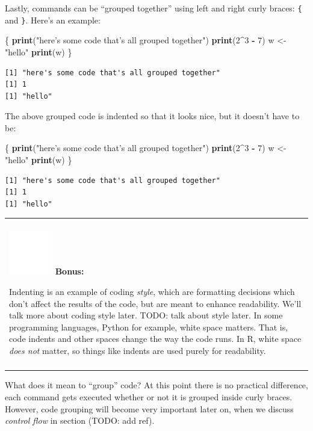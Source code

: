 \documentclass[
]{book}
\newenvironment{Shaded}{\begin{snugshade}}{\end{snugshade}}
\newcommand{\DecValTok}[1]{\textcolor[rgb]{0.00,0.00,0.81}{#1}}
\newcommand{\KeywordTok}[1]{\textcolor[rgb]{0.13,0.29,0.53}{\textbf{#1}}}
\newcommand{\NormalTok}[1]{#1}
\newcommand{\OperatorTok}[1]{\textcolor[rgb]{0.81,0.36,0.00}{\textbf{#1}}}
\newcommand{\StringTok}[1]{\textcolor[rgb]{0.31,0.60,0.02}{#1}}
\newenvironment{bonus}
{
  \begin{center}
  \begin{tabular}{|>{\columncolor{bonus}\color{white}}p{0.9\textwidth}|}\hline\\
  \includegraphics[scale=0.1]{src/images/sun-fill-invert.png}
  \textbf{Bonus:}
}
{\\\\\hline
  \end{tabular}
  \end{center}
}
\begin{document}
Lastly, commands can be ``grouped together'' using left and right curly braces: \texttt{\{} and \texttt{\}}.
Here's an example:

\begin{Shaded}
\begin{Highlighting}[]
\NormalTok{\{}
  \KeywordTok{print}\NormalTok{(}\StringTok{"here's some code that's all grouped together"}\NormalTok{)}
  \KeywordTok{print}\NormalTok{(}\DecValTok{2}\OperatorTok{^}\DecValTok{3} \OperatorTok{-}\StringTok{ }\DecValTok{7}\NormalTok{)}
\NormalTok{  w <-}\StringTok{ "hello"}
  \KeywordTok{print}\NormalTok{(w)}
\NormalTok{\}}
\end{Highlighting}
\end{Shaded}

\begin{verbatim}
[1] "here's some code that's all grouped together"
[1] 1
[1] "hello"
\end{verbatim}

The above grouped code is indented so that it looks nice, but it doesn't have to be:

\begin{Shaded}
\begin{Highlighting}[]
\NormalTok{\{}
\KeywordTok{print}\NormalTok{(}\StringTok{"here's some code that's all grouped together"}\NormalTok{)}
\KeywordTok{print}\NormalTok{(}\DecValTok{2}\OperatorTok{^}\DecValTok{3} \OperatorTok{-}\StringTok{ }\DecValTok{7}\NormalTok{)}
\NormalTok{w <-}\StringTok{ "hello"}
\KeywordTok{print}\NormalTok{(w)}
\NormalTok{\}}
\end{Highlighting}
\end{Shaded}

\begin{verbatim}
[1] "here's some code that's all grouped together"
[1] 1
[1] "hello"
\end{verbatim}

\begin{bonus}
Indenting is an example of coding \emph{style}, which are formatting
decisions which don't affect the results of the code, but are meant to
enhance readability. We'll talk more about coding style later. TODO:
talk about style later. In some programming languages, Python for
example, white space matters. That is, code indents and other spaces
change the way the code runs. In R, white space \emph{does not} matter,
so things like indents are used purely for readability.
\end{bonus}

What does it mean to ``group'' code?
At this point there is no practical difference, each command gets executed whether or not it is grouped inside curly braces.
However, code grouping will become very important later on, when we discuss \emph{control flow} in section (TODO: add ref).
\end{document}
